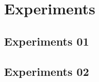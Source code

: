 
\section{Experiments}
\label{sec:p1-experiment}

\subsection{Experiments 01}


\subsection{Experiments 02}

